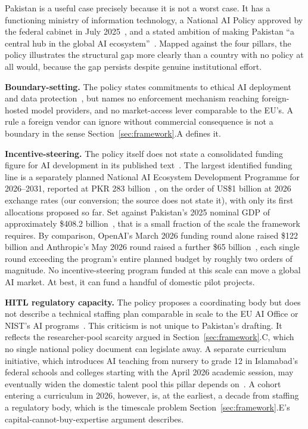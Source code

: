 \documentclass{ieeeaccess}
\begin{document}
Pakistan is a useful case precisely because it is not a worst case. It has a functioning ministry of information technology, a National AI Policy approved by the federal cabinet in July 2025~\cite{dawn2025aipolicyapproval}, and a stated ambition of making Pakistan ``a central hub in the global AI ecosystem''~\cite{pakistan2025nationalaipolicy}.
Mapped against the four pillars, the policy illustrates the structural gap more clearly than a country with no policy at all would, because the gap persists despite genuine institutional effort.

\textbf{Boundary-setting.} The policy states commitments to ethical AI deployment and data protection~\cite{pakistan2025nationalaipolicy},
but names no enforcement mechanism reaching foreign-hosted model providers, and no market-access lever comparable to the EU's. A rule a foreign vendor can ignore without commercial consequence is not a boundary in the sense Section~\ref{sec:framework}.A defines it.

\textbf{Incentive-steering.} The policy itself does not state a consolidated funding figure for AI development in its published text~\cite{pakistan2025nationalaipolicy}. The largest identified funding line is a separately planned National AI Ecosystem Development Programme for 2026--2031, reported at PKR 283 billion~\cite{app2026naiedp}, on the order of US\$1 billion at 2026 exchange rates (our conversion; the source does not state it), with only its first allocations proposed so far. Set against Pakistan's 2025 nominal GDP of approximately \$408.2 billion~\cite{imf2025pakistangdp}, that is a small fraction of the scale the framework requires. By comparison, OpenAI's March 2026 funding round alone raised \$122 billion and Anthropic's May 2026 round raised a further \$65 billion~\cite{openai2026funding,anthropic2026funding}, each single round exceeding the program's entire planned budget by roughly two orders of magnitude. No incentive-steering program funded at this scale can move a global AI market. At best, it can fund a handful of domestic pilot projects.

\textbf{HITL regulatory capacity.} The policy proposes a coordinating body but does not describe a technical staffing plan comparable in scale to the EU AI Office or NIST's AI programs~\cite{pakistan2025nationalaipolicy}.
This criticism is not unique to Pakistan's drafting. It reflects the researcher-pool scarcity argued in Section~\ref{sec:framework}.C, which no single national policy document can legislate away. A separate curriculum initiative, which introduces AI teaching from nursery to grade 12 in Islamabad's federal schools and colleges starting with the April 2026 academic session, may eventually widen the domestic talent pool this pillar depends on~\cite{dawn2026curriculum}. A cohort entering a curriculum in 2026, however, is, at the earliest, a decade from staffing a regulatory body, which is the timescale problem Section~\ref{sec:framework}.E's capital-cannot-buy-expertise argument describes.
\end{document}
